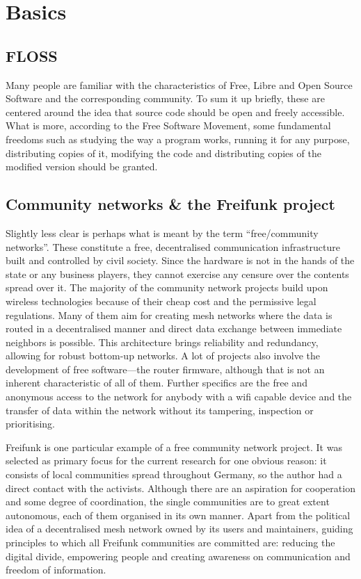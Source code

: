 \section{Basics}
\subsection{FLOSS}
Many people are familiar with the characteristics of Free, Libre and Open Source Software and the corresponding community.
To sum it up briefly, these are centered around the idea that source code should be open and freely accessible.
What is more, according to the Free Software Movement,
some fundamental freedoms such as studying the way a program works, running it for any purpose, distributing copies of it, modifying the code and distributing copies of the modified version should be granted\cite{gnuweb}.


\subsection{Community networks \& the Freifunk project}
Slightly less clear is perhaps what is meant by the term ``free/community networks''.
These constitute a free, decentralised communication infrastructure built and controlled by civil society.
Since the hardware is not in the hands of the state or any business players, they cannot exercise any censure over the contents spread over it. %
The majority of the community network projects build upon wireless technologies because of their cheap cost and the permissive legal regulations\cite{WNDW2013}\cite{Medosch2004}.
Many of them aim for creating mesh networks where the data is routed in a decentralised manner and direct data exchange between immediate neighbors is possible.
This architecture brings reliability and redundancy, allowing for robust bottom-up networks\cite{Medosch2004}.
A lot of projects also involve the development of free software---the router firmware, although that is not an inherent characteristic of all of them.
Further specifics are the free and anonymous access to the network for anybody with a wifi capable device and the transfer of data within the network without its tampering, inspection or prioritising\cite{ffweb}\cite{Medosch2004}. %

Freifunk is one particular example of a free community network project.
It was selected as primary focus for the current research for one obvious reason: it consists of local communities spread throughout Germany, so the author had a direct contact with the activists.
Although there are an aspiration for cooperation and some degree of coordination, the single communities are to great extent autonomous, each of them organised in its own manner.
Apart from the political idea of a decentralised mesh network owned by its users and maintainers, guiding principles to which all Freifunk communities are committed are: reducing the digital divide, empowering people and creating awareness on communication and freedom of information\cite{ffweb}.

